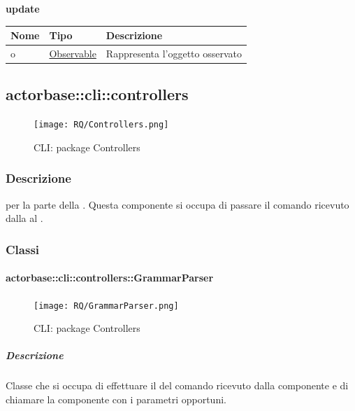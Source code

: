 \documentclass{scalatekids-article}
\begin{document}
\begin{center}
  \textbf{update}
\end{center}
\begin{tabular}{| p{3cm} | p{3.5cm} | p{8.5cm} |}
  \hline
  Nome & Tipo & Descrizione\\
  \hline
  o & \hyperref[actorbase::cli::models::Observable]{Observable} & Rappresenta l'oggetto osservato\\
  \hline
\end{tabular}

\subsection{actorbase::cli::controllers}
\label{sec:actorbase::cli::controllers}

\begin{figure}[H]
  \begin{center}
    \texttt{[image: RQ/Controllers.png]}
    \caption{CLI: package Controllers}
  \end{center}
\end{figure}

\subsubsection{Descrizione}

 per la parte  della . Questa
componente si occupa di passare il comando ricevuto dalla  al
.

\subsubsection{Classi}

\paragraph{actorbase::cli::controllers::GrammarParser}
\label{sec:actorbase::cli::controllers::GrammarParser}

\begin{figure}[H]
  \begin{center}
    \texttt{[image: RQ/GrammarParser.png]}
    \caption{CLI: package Controllers}
  \end{center}
\end{figure}

\subparagraph{Descrizione}

Classe che si occupa di effettuare il  del comando ricevuto
dalla componente  e di chiamare la componente  con i
parametri opportuni.
\end{document}
